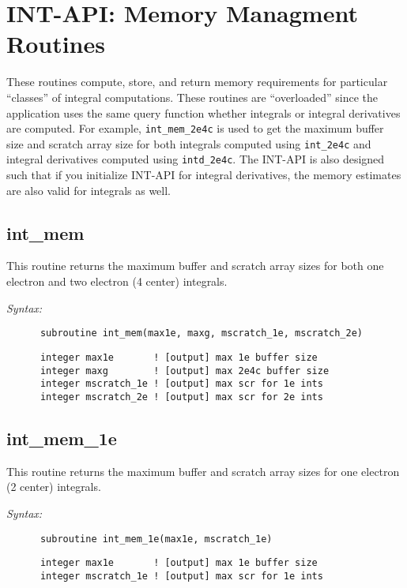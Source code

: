 \section{INT-API: Memory Managment Routines} 
These routines compute, store, and return memory requirements for 
particular ``classes'' of integral computations.  These routines are 
``overloaded'' since the application uses the same query function 
whether integrals or integral derivatives are computed.  For example, 
\verb+int_mem_2e4c+ is used to get the maximum buffer size and scratch 
array size for both integrals computed using \verb+int_2e4c+ and 
integral derivatives computed using \verb+intd_2e4c+.  The INT-API is 
also designed such that if you initialize INT-API for integral 
derivatives, the memory estimates are also valid for integrals as 
well.   
% 
 
\subsection{int\_mem} 
This routine returns the maximum buffer and scratch array 
sizes for both one electron and two electron (4 center)  
integrals. 
 
{\it Syntax:} 
\begin{verbatim} 
      subroutine int_mem(max1e, maxg, mscratch_1e, mscratch_2e) 
\end{verbatim} 
\begin{verbatim} 
      integer max1e       ! [output] max 1e buffer size 
      integer maxg        ! [output] max 2e4c buffer size 
      integer mscratch_1e ! [output] max scr for 1e ints 
      integer mscratch_2e ! [output] max scr for 2e ints 
\end{verbatim} 
\subsection{int\_mem\_1e} 
This routine returns the maximum buffer and scratch array 
sizes for one electron (2 center) 
integrals. 
 
{\it Syntax:} 
\begin{verbatim} 
      subroutine int_mem_1e(max1e, mscratch_1e) 
\end{verbatim} 
\begin{verbatim} 
      integer max1e       ! [output] max 1e buffer size 
      integer mscratch_1e ! [output] max scr for 1e ints 
\end{verbatim} 
